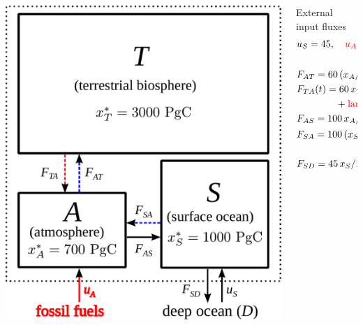 
\begin{columns}
	\newlength{\lc}
	\setlength{\lc}{0.48\textwidth}
	\begin{column}{\lc}
	\includegraphics[width=0.9\lc,clip=true,trim= 0cm 0cm .5cm 0cm]{images/content/model.pdf}
	\end{column}
	\newlength{\rc}
	\setlength{\rc}{\the\dimexpr (\textwidth-\lc) \relax }
	\begin{column}{\rc}
		External input fluxes
		\begin{align*}
			&u_S = 45, \quad {\color{red}u_A(t)=\text{fossil-fuels}(t)}\\
			&\vspace{3.5cm}\\
			&F_{AT} = 60\,(x_A/700){\color{blue}^{0.2}}\\
			&F_{TA}(t) = 60\,x_T/3000\\
			&\qquad\qquad + {\color{red}\text{land-use-change}(t)}\\
			&F_{AS} = 100\,x_A/700\\
			&F_{SA} = 100\,(x_S/1000){\color{blue}^{10}}\\
			&\vspace{3.5cm}\\
			&F_{SD} = 45\,x_S/1000
		\end{align*}
	\end{column}
\end{columns}
